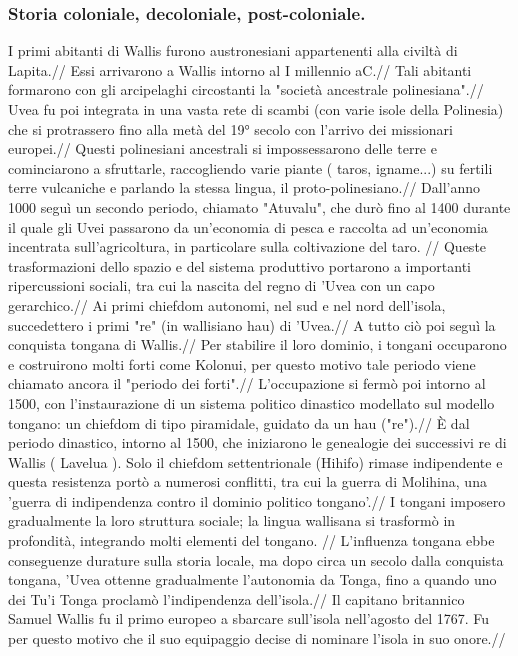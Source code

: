 \documentclass[fleqn,10pt]{SelfArx} %
\begin{document}
\subsubsection{Storia coloniale, decoloniale, post-coloniale.}
I primi abitanti di Wallis furono austronesiani appartenenti alla civiltà di Lapita.//
Essi arrivarono a Wallis intorno al I millennio aC.//
Tali abitanti formarono con gli arcipelaghi circostanti la "società ancestrale polinesiana".//
Uvea fu poi integrata in una vasta rete di scambi (con varie isole della Polinesia) che si protrassero fino alla metà del 19° secolo con l'arrivo dei missionari europei.//
Questi polinesiani ancestrali si impossessarono delle terre e cominciarono a sfruttarle, raccogliendo varie piante ( taros, igname...) su fertili terre vulcaniche e parlando la stessa lingua, il proto-polinesiano.//
Dall'anno 1000 seguì un secondo periodo, chiamato "Atuvalu", che durò fino al 1400 durante il quale gli Uvei passarono da un'economia di pesca e raccolta ad un'economia incentrata sull'agricoltura, in particolare sulla coltivazione del taro. //
Queste trasformazioni dello spazio e del sistema produttivo portarono a importanti ripercussioni sociali, tra cui la nascita del regno di 'Uvea con un capo gerarchico.// 
Ai primi chiefdom autonomi, nel sud e nel nord dell'isola, succedettero i primi "re" (in wallisiano hau) di 'Uvea.//
A tutto ciò poi seguì la conquista tongana di Wallis.//
Per stabilire il loro dominio, i tongani occuparono e costruirono molti forti come Kolonui, per questo motivo tale periodo viene chiamato ancora il "periodo dei forti".//
L'occupazione si fermò poi intorno al 1500, con l'instaurazione di un sistema politico dinastico modellato sul modello tongano: un chiefdom di tipo piramidale, guidato da un hau ("re").//
È dal periodo dinastico, intorno al 1500, che iniziarono le genealogie dei successivi re di Wallis ( Lavelua ). 
Solo il chiefdom settentrionale (Hihifo) rimase indipendente e questa resistenza portò a numerosi conflitti, tra cui la guerra di Molihina, una 'guerra di indipendenza contro il dominio politico tongano'.//
I tongani imposero gradualmente la loro struttura sociale; la lingua wallisana si trasformò in profondità, integrando molti elementi del tongano. //
L'influenza tongana ebbe conseguenze durature sulla storia locale, ma dopo circa un secolo dalla conquista tongana, 'Uvea ottenne gradualmente l'autonomia da Tonga, fino a quando uno dei Tu'i Tonga proclamò l'indipendenza dell'isola.// 
Il capitano britannico Samuel Wallis fu il primo europeo a sbarcare sull'isola nell'agosto del 1767. Fu per questo motivo che il suo equipaggio decise di nominare l'isola in suo onore.//
\end{document}
